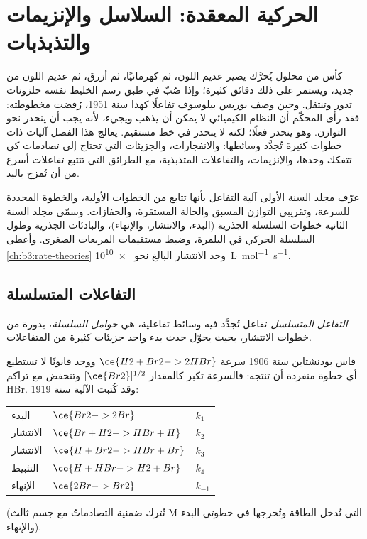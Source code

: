 \chapter{الحركية المعقدة: السلاسل والإنزيمات والتذبذبات}\label{ch:b3:complex-kinetics}

كأس من محلول يُحرَّك يصير عديم اللون، ثم كهرمانيًا، ثم أزرق، ثم
عديم اللون من جديد، ويستمر على ذلك دقائق كثيرة؛ وإذا صُبّ في طبق رسم
الخليط نفسه حلزونات تدور وتنتقل. وحين وصف بوريس بيلوسوف
تفاعلًا كهذا سنة 1951، رُفضت مخطوطته: فقد رأى المحكّم أن النظام الكيميائي
لا يمكن أن يذهب ويجيء، لأنه يجب أن ينحدر
نحو التوازن. وهو ينحدر فعلًا؛ لكنه لا ينحدر
في خط مستقيم. يعالج هذا الفصل آليات ذات خطوات كثيرة تُجدَّد وسائطها:
 والانفجارات، والجزيئات التي تحتاج إلى
تصادمات كي تتفكك وحدها، والإنزيمات، والتفاعلات المتذبذبة، مع
الطرائق التي تتتبع تفاعلات أسرع من أن تُمزج باليد.

\begin{recall}
عرّف مجلد السنة الأولى آلية التفاعل بأنها تتابع من الخطوات
الأولية، والخطوة المحددة للسرعة، وتقريبي التوازن المسبق والحالة
المستقرة، والحفازات. وسمّى مجلد السنة الثانية خطوات السلسلة
الجذرية (البدء، والانتشار، والإنهاء)، والبادئات الجذرية 
وطول السلسلة الحركي في البلمرة، وضبط مستقيمات المربعات الصغرى.
وأعطى \cref{ch:b3:rate-theories}  وحد الانتشار
البالغ نحو \qty{e10}{L.mol^{-1}.s^{-1}}.
\end{recall}

\section{التفاعلات المتسلسلة}

\begin{definition}\label{def:b3:complex-kinetics:chain}
\emph{التفاعل المتسلسل} تفاعل تُجدَّد فيه
وسائط تفاعلية، هي \emph{حوامل السلسلة}، بدورة
من خطوات الانتشار، بحيث يحوّل حدث بدء واحد جزيئات كثيرة من
المتفاعلات.
\end{definition}

قاس بودنشتاين سنة 1906 سرعة $\ce{H2 + Br2 -> 2 HBr}$ ووجد قانونًا لا تستطيع
أي خطوة منفردة أن تنتجه: فالسرعة تكبر كالمقدار $[\ce{Br2}]^{1/2}$ وتنخفض مع تراكم HBr.
وقد كُتبت الآلية سنة 1919:
\begin{center}
\begin{tabular}{lll}
البدء & $\ce{Br2 -> 2 Br}$ & $k_1$ \\
الانتشار & $\ce{Br + H2 -> HBr + H}$ & $k_2$ \\
الانتشار & $\ce{H + Br2 -> HBr + Br}$ & $k_3$ \\
التثبيط & $\ce{H + HBr -> H2 + Br}$ & $k_4$ \\
الإنهاء & $\ce{2 Br -> Br2}$ & $k_{-1}$
\end{tabular}
\end{center}
(تُترك ضمنية التصادماتُ مع جسم ثالث M التي تُدخل الطاقة وتُخرجها في خطوتي
البدء والإنهاء).

